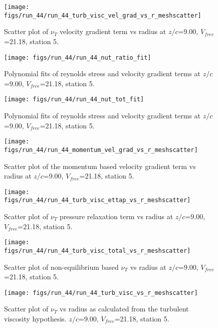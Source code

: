 \begin{figure}[H]
\centering
\texttt{[image: figs/run\_44/run\_44\_turb\_visc\_vel\_grad\_vs\_r\_meshscatter]}
\caption{Scatter plot of $\nu_T$ velocity gradient term vs radius at $z/c$=9.00, $V_{free}$=21.18, station 5.}
\end{figure}


\begin{figure}[H]
\centering
\texttt{[image: figs/run\_44/run\_44\_nut\_ratio\_fit]}
\caption{Polynomial fits of reynolds stress and velocity gradient terms at $z/c$=9.00, $V_{free}$=21.18, station 5.}
\end{figure}


\begin{figure}[H]
\centering
\texttt{[image: figs/run\_44/run\_44\_nut\_tot\_fit]}
\caption{Polynomial fits of reynolds stress and velocity gradient terms at $z/c$=9.00, $V_{free}$=21.18, station 5.}
\end{figure}


\begin{figure}[H]
\centering
\texttt{[image: figs/run\_44/run\_44\_momentum\_vel\_grad\_vs\_r\_meshscatter]}
\caption{Scatter plot of the momentum based velocity gradient term vs radius at $z/c$=9.00, $V_{free}$=21.18, station 5.}
\end{figure}


\begin{figure}[H]
\centering
\texttt{[image: figs/run\_44/run\_44\_turb\_visc\_ettap\_vs\_r\_meshscatter]}
\caption{Scatter plot of $\nu_T$ pressure relaxation term vs radius at $z/c$=9.00, $V_{free}$=21.18, station 5.}
\end{figure}


\begin{figure}[H]
\centering
\texttt{[image: figs/run\_44/run\_44\_turb\_visc\_total\_vs\_r\_meshscatter]}
\caption{Scatter plot of non-equilibrium based $\nu_T$ vs radius at $z/c$=9.00, $V_{free}$=21.18, station 5.}
\end{figure}


\begin{figure}[H]
\centering
\texttt{[image: figs/run\_44/run\_44\_turb\_visc\_vs\_r\_meshscatter]}
\caption{Scatter plot of $\nu_T$ vs radius as calculated from the turbulent viscosity hypothesis. $z/c$=9.00, $V_{free}$=21.18, station 5.}
\end{figure}


